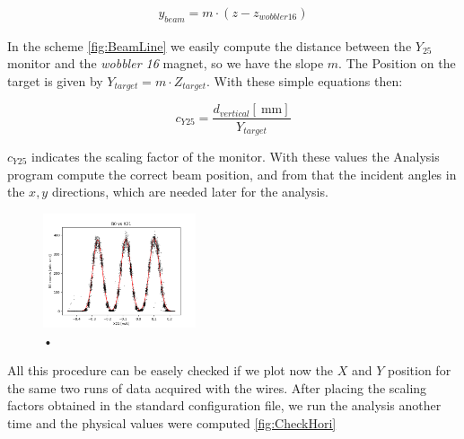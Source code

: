 \begin{align*}
y_{beam} = m \cdot (z - z_{wobbler 16})
\end{align*}

In the scheme \ref{fig:BeamLine} we easily compute the distance between the $Y_{25}$ monitor and the \textit{wobbler 16} magnet, so we have the slope $m$. The Position on the target is given by $Y_{target} = m \cdot Z_{target}$. With these simple equations then:

\begin{equation}
c_{Y25} = \dfrac{d_{vertical} [\SI{}{\milli \meter}]}{ Y_{target}} 
\end{equation}

$c_{Y25}$ indicates the scaling factor of the monitor. With these values the Analysis program compute the correct beam position, and from that the incident angles in the $x,y$ directions, which are needed later for the analysis.

\begin{figure}[hbtp]
\centering
\includegraphics[width=0.4\textwidth]{Analysis/HorizontalCalibration.png}
\caption{•}
\label{fig:HorizontalCalibration}
\end{figure}

All this procedure can be easely checked if we plot now the $X$ and $Y$ position for the same two runs of data acquired with the wires. After placing the scaling factors obtained in the standard configuration file, we run the analysis another time and the physical values were computed \ref{fig:CheckHori}

